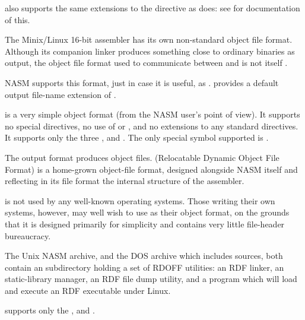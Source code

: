  also supports the same extensions to the 
directive as  does: see  for
documentation of this.


The Minix/Linux 16-bit assembler  has its own non-standard
object file format. Although its companion linker 
produces something close to ordinary  binaries as output,
the object file format used to communicate between  and
 is not itself .

NASM supports this format, just in case it is useful, as .
 provides a default output file-name extension of .

 is a very simple object format (from the NASM user's point
of view). It supports no special directives, no use of  or
, and no extensions to any standard directives. It supports
only the three  ,
 and . The only special symbol supported
is .


The  output format produces  object files.
 (Relocatable Dynamic Object File Format) is a home-grown
object-file format, designed alongside NASM itself and reflecting in
its file format the internal structure of the assembler.

 is not used by any well-known operating systems. Those
writing their own systems, however, may well wish to use 
as their object format, on the grounds that it is designed primarily
for simplicity and contains very little file-header bureaucracy.

The Unix NASM archive, and the DOS archive which includes sources,
both contain an  subdirectory
holding a set of RDOFF utilities: an RDF linker, an 
static-library manager, an RDF file dump utility, and a program
which will load and execute an RDF executable under Linux.

 supports only the 
,  and .


